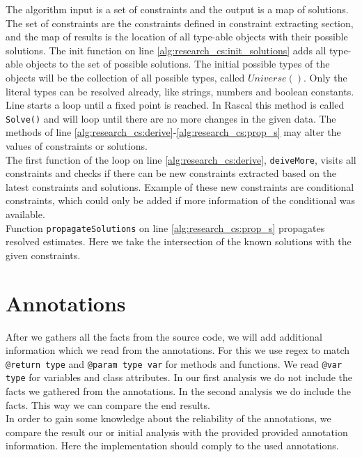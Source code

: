 \documentclass[../main.tex]{subfiles}
\begin{document}
    
    The algorithm input is a set of constraints and the output is a map of solutions.
    The set of constraints are the constraints defined in constraint extracting section, and the map of results is the location of all type-able objects with their possible solutions.
    The init function on line \ref{alg:research_cs:init_solutions} adds all type-able objects to the set of possible solutions.
    The initial possible types of the objects will be the collection of all possible types, called $Universe()$.
    Only the literal types can be resolved already, like strings, numbers and boolean constants.
    \\
    Line \label{alg:research_cs:loop_start} starts a loop until a fixed point is reached. 
    In Rascal this method is called \texttt{Solve()} and will loop until there are no more changes in the given data.
    The methods of line \ref{alg:research_cs:derive}-\ref{alg:research_cs:prop_s} may alter the values of constraints or solutions.
    \\
    The first function of the loop on line \ref{alg:research_cs:derive}, \texttt{deiveMore}, visits all constraints and checks if there can be new constraints extracted based on the latest constraints and solutions.
    Example of these new constraints are conditional constraints, which could only be added if more information of the conditional was available.
    \\
    Function \texttt{propagateSolutions} on line \ref{alg:research_cs:prop_s} propagates resolved estimates. 
    Here we take the intersection of the known solutions with the given constraints.

    \section{Annotations}\label{sec:annotations}
    After we gathers all the facts from the source code, we will add additional information which we read from the annotations.
    For this we use regex to match \texttt{@return type} and \texttt{@param type var} for methods and functions.
    We read \texttt{@var type} for variables and class attributes.
    In our first analysis we do not include the facts we gathered from the annotations. 
    In the second analysis we do include the facts.
    This way we can compare the end results.
    \\
    In order to gain some knowledge about the reliability of the annotations, we compare the result our or initial analysis with the provided provided annotation information.
    Here the implementation should comply to the used annotations.
        
\end{document}

